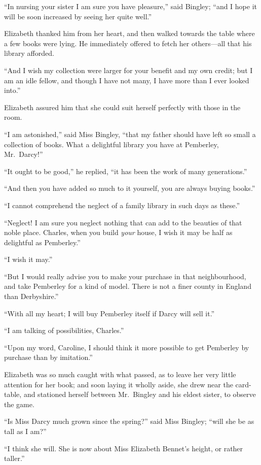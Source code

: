 ``In nursing your sister I am sure you have pleasure,'' said Bingley;
``and I hope it will be soon increased by seeing her quite well.''

Elizabeth thanked him from her heart, and then walked towards
the table where a few books were lying.  He immediately offered
to fetch her others---all that his library afforded.

``And I wish my collection were larger for your benefit and my
own credit; but I am an idle fellow, and though I have not many,
I have more than I ever looked into.''

Elizabeth assured him that she could suit herself perfectly with
those in the room.

``I am astonished,'' said Miss Bingley, ``that my father should
have left so small a collection of books.  What a delightful library
you have at Pemberley, Mr.\ Darcy!''

``It ought to be good,'' he replied, ``it has been the work of many
generations.''

``And then you have added so much to it yourself, you are
always buying books.''

``I cannot comprehend the neglect of a family library in such days
as these.''

``Neglect!  I am sure you neglect nothing that can add to the
beauties of that noble place.  Charles, when you build \emph{your}
house, I wish it may be half as delightful as Pemberley.''

``I wish it may.''

``But I would really advise you to make your purchase in that
neighbourhood, and take Pemberley for a kind of model.  There
is not a finer county in England than Derbyshire.''

``With all my heart; I will buy Pemberley itself if Darcy will
sell it.''

``I am talking of possibilities, Charles.''

``Upon my word, Caroline, I should think it more possible to get
Pemberley by purchase than by imitation.''

Elizabeth was so much caught with what passed, as to leave her
very little attention for her book; and soon laying it wholly
aside, she drew near the card-table, and stationed herself
between Mr.\ Bingley and his eldest sister, to observe the game.

``Is Miss Darcy much grown since the spring?'' said Miss
Bingley; ``will she be as tall as I am?''

``I think she will.  She is now about Miss Elizabeth Bennet's
height, or rather taller.''

